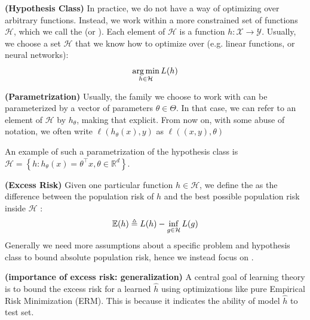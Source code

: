 \documentclass{article}
\newcommand{\bfs}[1]{\textbf{({#1}) }}
\begin{document}
\begin{defa}\bfs{Hypothesis Class}
In practice, we do not have a way of optimizing over arbitrary functions. Instead, we work within a more constrained set of functions $\mathcal{H}$, which we call the  (or ). Each element of $\mathcal{H}$ is a function $h: \mathcal{X} \rightarrow \mathcal{Y}$. Usually, we choose a set $\mathcal{H}$ that we know how to optimize over (e.g. linear functions, or neural networks):$$\operatorname*{arg\,min}_{h\in\mathcal{H}} L(h)$$
\end{defa}
\begin{rema}\bfs{Parametrization}
Usually, the family we choose to work with can be parameterized by a vector of parameters $\theta \in \Theta$. In that case, we can refer to an element of $\mathcal{H}$ by $h_{\theta}$, making that explicit.  From now on, with some abuse of notation, we often write $\ell\left(h_{\theta}(x), y\right)$ as $\ell((x, y), \theta)$
\end{rema}
\begin{exma}
 An example of such a parametrization of the hypothesis class is $\mathcal{H}=\left\{h: h_{\theta}(x)=\theta^{\top} x, \theta \in \mathbb{R}^{d}\right\}$.
\end{exma}
\begin{defa}\bfs{Excess Risk}
Given one particular function $h \in \mathcal{H}$, we define the  as the difference between the population risk of $h$ and the best possible population risk inside $\mathcal{H}$ :
\begin{align*}
\E(h) \triangleq L(h)-\inf _{g \in \mathcal{H}} L(g)
\end{align*}
Generally we need more assumptions about a specific problem and hypothesis class to bound absolute population risk, hence we instead focus on .
\end{defa}
\begin{rema}\bfs{importance of excess risk: generalization}
A central goal of learning theory is to bound the excess risk for a learned $\hat{h}$ using optimizations like pure Empirical Risk Minimization (ERM). This is because it indicates the  ability of model $\hat{h}$ to test set.
\end{rema}
\end{document}

